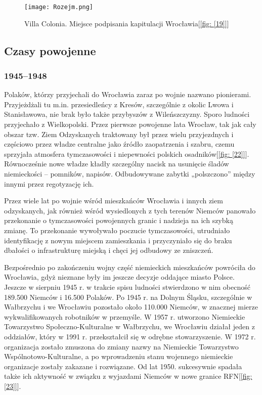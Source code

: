 \documentclass{article}
\begin{document}
\begin{center}
\begin{figure}[h]
	\centering
	\texttt{[image: Rozejm.png]}
	\caption{Villa Colonia. Miejsce podpisania kapitulacji Wrocławia[\ref{fig: [19]}]}
\end{figure}
\end{center}

\subsection {Czasy powojenne}
\subsubsection {1945–1948}

Polaków, którzy przyjechali do Wrocławia zaraz po wojnie nazwano pionierami. Przyjeżdżali tu m.in. przesiedleńcy z Kresów, szczególnie z okolic Lwowa i Stanisławowa, nie brak było także przybyszów z Wileńszczyzny. Sporo ludności przyjechało z Wielkopolski. Przez pierwsze powojenne lata Wrocław, tak jak cały obszar tzw. Ziem Odzyskanych traktowany był przez wielu przyjezdnych i częściowo przez władze centralne jako źródło zaopatrzenia i szabru, czemu sprzyjała atmosfera tymczasowości i niepewności polskich osadników[\ref{fig: [22]}]. Równocześnie nowe władze kładły szczególny nacisk na usunięcie śladów niemieckości – pomników, napisów. Odbudowywane zabytki „polszczono” między innymi przez regotyzację ich.

Przez wiele lat po wojnie wśród mieszkańców Wrocławia i innych ziem odzyskanych, jak również wśród wysiedlonych z tych terenów Niemców panowało przekonanie o tymczasowości powojennych granic i nadzieja na ich szybką zmianę. To przekonanie wywoływało poczucie tymczasowości, utrudniało identyfikację z nowym miejscem zamieszkania i przyczyniało się do braku dbałości o infrastrukturę miejską i chęci jej odbudowy ze zniszczeń.

Bezpośrednio po zakończeniu wojny część niemieckich mieszkańców powróciła do Wrocławia, gdyż nieznane były im jeszcze decyzje oddające miasto Polsce. Jeszcze w sierpniu 1945 r. w trakcie spisu ludności stwierdzono w nim obecność 189.500 Niemców i 16.500 Polaków. Po 1945 r. na Dolnym Śląsku, szczególnie w Wałbrzychu i we Wrocławiu pozostało około 110.000 Niemców, w znacznej mierze wykwalifikowanych robotników w przemyśle. W 1957 r. utworzono Niemieckie Towarzystwo Społeczno-Kulturalne w Wałbrzychu, we Wrocławiu działał jeden z oddziałów, który w 1991 r. przekształcił się w odrębne stowarzyszenie. W 1972 r. organizacja zostało zmuszona do zmiany nazwy na Niemieckie Towarzystwo Wspólnotowo-Kulturalne, a po wprowadzeniu stanu wojennego niemieckie organizacje zostały zakazane i rozwiązane. Od lat 1950. sukcesywnie spadała także ich aktywność w związku z wyjazdami Niemców w nowe granice RFN[\ref{fig: [23]}].
\end{document}
